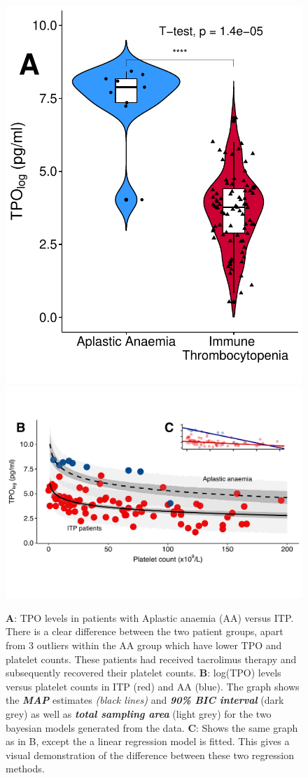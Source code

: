 \documentclass[landscape,a0paper,fontscale=0.285]{beamer} %
\newlength{\onecolwid}
\newlength{\twocolwid}
\begin{document}
\begin{frame}[t]
\begin{columns}[t]
\begin{column}{\twocolwid}
\begin{columns}[t,totalwidth=\twocolwid]
\begin{column}{\onecolwid}




\end{column} %

\end{columns} %


\begin{figure}%
    \centering
    {{\includegraphics[width=0.29\linewidth]{fig/AA_vs_ITP_2.pdf}}}%
    \qquad
    {{\includegraphics[width=0.67\linewidth]{fig/bayes_model2.pdf}}}%
    \caption{\textbf{A}: TPO levels in patients with Aplastic anaemia (AA) versus ITP. There is a clear difference between the two patient groups, apart from 3 outliers within the AA group which have lower TPO and platelet counts. These patients had received tacrolimus therapy and subsequently recovered their platelet counts. \textbf{B}: log(TPO) levels versus platelet counts in ITP (red) and AA (blue). The graph shows the \textit{\textbf{MAP}} estimates \emph{(black lines)} and \textit{\textbf{90\% BIC interval}} (dark grey) as well as \textit{\textbf{total sampling area}} (light grey) for the two bayesian models generated from the data. \textbf{C}: Shows the same graph as in B, except the a linear regression model is fitted. This gives a visual demonstration of the difference between these two regression methods.}%
    \label{fig:example}%
\end{figure}



\end{column}
\end{columns}
\end{frame}
\end{document}
